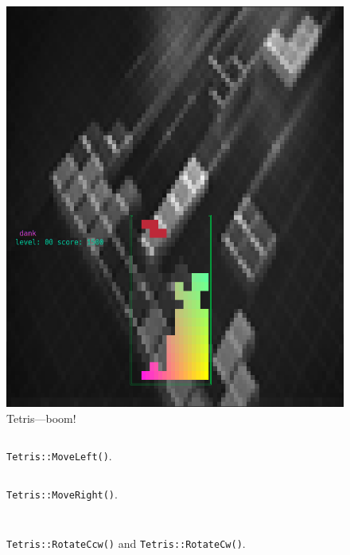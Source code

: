 \begin{figure}
\begin{minipage}{0.45\textwidth}
    \includegraphics[width=1\linewidth]{media/tetris-postscore.png}
    \caption{Tetris---boom!}
  \end{minipage}
\end{figure}

\begin{figure}
  \centering
  \begin{minipage}{0.45\textwidth}
    \inputminted[]{C}{code-tetris/moveleft.h}
    \caption{\texttt{Tetris::MoveLeft()}.}
  \end{minipage}\hfill
  \begin{minipage}{0.45\textwidth}
    \inputminted[]{C}{code-tetris/moveright.h}
    \caption{\texttt{Tetris::MoveRight()}.}
  \end{minipage}
  \label{list:tetris-move}
\end{figure}

\begin{figure}
  \centering
  \begin{minipage}{0.45\textwidth}
    \inputminted[]{C}{code-tetris/rotate-cw.h}
  \end{minipage}\hfill
  \begin{minipage}{0.45\textwidth}
    \inputminted[]{C}{code-tetris/rotate-ccw.h}
  \end{minipage}
  \caption{\texttt{Tetris::RotateCcw()} and \texttt{Tetris::RotateCw()}.}
  \label{list:tetris-rotate}
\end{figure}

